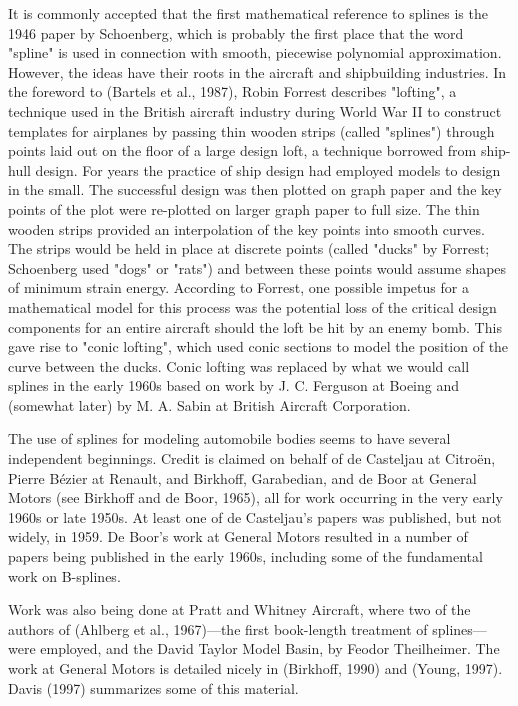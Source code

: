 \documentclass[preprint,12pt]{elsarticle}
\begin{document}
It is commonly accepted that the first mathematical reference to splines is the 1946 paper by Schoenberg, which is probably the first place that the word "spline" is used in connection with smooth, piecewise polynomial approximation. However, the ideas have their roots in the aircraft and shipbuilding industries. In the foreword to (Bartels et al., 1987), Robin Forrest describes "lofting", a technique used in the British aircraft industry during World War II to construct templates for airplanes by passing thin wooden strips (called "splines") through points laid out on the floor of a large design loft, a technique borrowed from ship-hull design. For years the practice of ship design had employed models to design in the small. The successful design was then plotted on graph paper and the key points of the plot were re-plotted on larger graph paper to full size. The thin wooden strips provided an interpolation of the key points into smooth curves. The strips would be held in place at discrete points (called "ducks" by Forrest; Schoenberg used "dogs" or "rats") and between these points would assume shapes of minimum strain energy. According to Forrest, one possible impetus for a mathematical model for this process was the potential loss of the critical design components for an entire aircraft should the loft be hit by an enemy bomb. This gave rise to "conic lofting", which used conic sections to model the position of the curve between the ducks. Conic lofting was replaced by what we would call splines in the early 1960s based on work by J. C. Ferguson at Boeing and (somewhat later) by M. A. Sabin at British Aircraft Corporation.

The use of splines for modeling automobile bodies seems to have several independent beginnings. Credit is claimed on behalf of de Casteljau at Citroën, Pierre B\'ezier at Renault, and Birkhoff, Garabedian, and de Boor at General Motors (see Birkhoff and de Boor, 1965), all for work occurring in the very early 1960s or late 1950s. At least one of de Casteljau's papers was published, but not widely, in 1959. De Boor's work at General Motors resulted in a number of papers being published in the early 1960s, including some of the fundamental work on B-splines.

Work was also being done at Pratt and Whitney Aircraft, where two of the authors of (Ahlberg et al., 1967)—the first book-length treatment of splines—were employed, and the David Taylor Model Basin, by Feodor Theilheimer. The work at General Motors is detailed nicely in (Birkhoff, 1990) and (Young, 1997). Davis (1997) summarizes some of this material.
\end{document}
